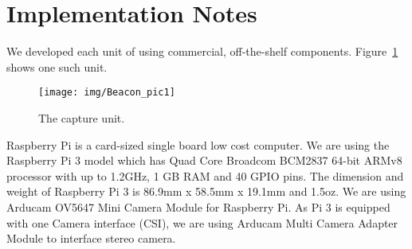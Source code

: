 

\section{Implementation Notes}
\label{sec:impl}

We developed each unit of \Sys using commercial, off-the-shelf components. Figure~\ref{fig:sys} shows one such unit.

\begin{figure}[!htb]
	\begin{center}
		\texttt{[image: img/Beacon\_pic1]}
		\caption{The capture unit. }
		\label{fig:sys}
	\end{center}
\end{figure}

Raspberry Pi is a card-sized single board low cost computer. We are using the Raspberry Pi 3 model which has Quad Core Broadcom BCM2837 64-bit ARMv8 processor with up to 1.2GHz, 1 GB RAM and 40 GPIO pins. The dimension  and weight of Raspberry Pi 3 is 86.9mm x 58.5mm x 19.1mm and 1.5oz. We are using Arducam OV5647 Mini Camera Module for Raspberry Pi. As Pi 3 is equipped with one Camera interface (CSI), we are using Arducam Multi Camera Adapter Module to interface stereo camera.


